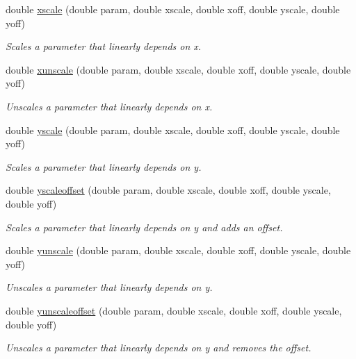 \begin{DoxyCompactItemize}
double \hyperlink{group__stfgen_gabe31dea1c4b9c10627815f17c56f4549}{xscale} (double param, double xscale, double xoff, double yscale, double yoff)
\begin{DoxyCompactList}\small\item\em Scales a parameter that linearly depends on x. \item\end{DoxyCompactList}\item 
double \hyperlink{group__stfgen_ga3f08b8e36843ae1e5ef9b285cc5f86b7}{xunscale} (double param, double xscale, double xoff, double yscale, double yoff)
\begin{DoxyCompactList}\small\item\em Unscales a parameter that linearly depends on x. \item\end{DoxyCompactList}\item 
double \hyperlink{group__stfgen_ga00c92887edc6d459207573419ede56ef}{yscale} (double param, double xscale, double xoff, double yscale, double yoff)
\begin{DoxyCompactList}\small\item\em Scales a parameter that linearly depends on y. \item\end{DoxyCompactList}\item 
double \hyperlink{group__stfgen_gae9d5e4c6d163781154d54888906e3928}{yscaleoffset} (double param, double xscale, double xoff, double yscale, double yoff)
\begin{DoxyCompactList}\small\item\em Scales a parameter that linearly depends on y and adds an offset. \item\end{DoxyCompactList}\item 
double \hyperlink{group__stfgen_ga7d081bd58e0107dc245a8441e45e3929}{yunscale} (double param, double xscale, double xoff, double yscale, double yoff)
\begin{DoxyCompactList}\small\item\em Unscales a parameter that linearly depends on y. \item\end{DoxyCompactList}\item 
double \hyperlink{group__stfgen_gab000f4b8bc54c11315091c912ba0c1e0}{yunscaleoffset} (double param, double xscale, double xoff, double yscale, double yoff)
\begin{DoxyCompactList}\small\item\em Unscales a parameter that linearly depends on y and removes the offset. \item\end{DoxyCompactList}\item 

\end{DoxyCompactItemize}
